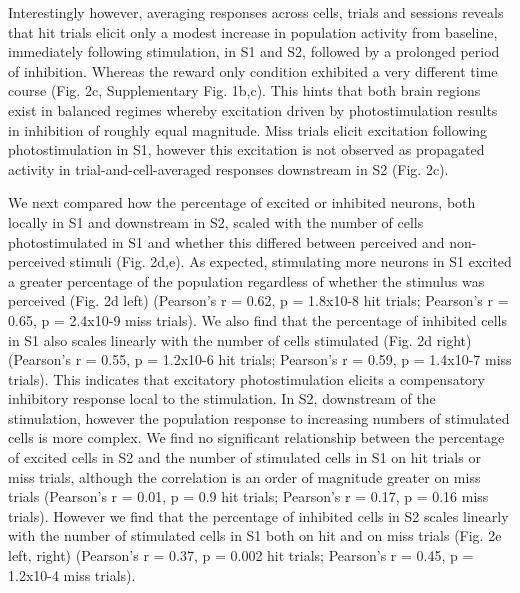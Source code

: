 \begin{figure}[htbp]
{} 
\label{fig:basic-analysis}
\end{figure}

Interestingly however, averaging responses across cells, trials and sessions reveals that hit trials elicit only a modest increase in population activity from baseline, immediately following stimulation, in S1 and S2, followed by a prolonged period of inhibition. Whereas the reward only condition exhibited a very different time course (Fig. 2c,  Supplementary Fig. 1b,c). This hints that both brain regions exist in balanced regimes whereby excitation driven by photostimulation results in inhibition of roughly equal magnitude. Miss trials elicit excitation following photostimulation in S1, however this excitation is not observed as propagated activity in trial-and-cell-averaged responses downstream in S2 (Fig. 2c). 

We next compared how the percentage of excited or inhibited neurons, both locally in S1 and downstream in S2, scaled with the number of cells photostimulated in S1 and whether this differed between perceived and non-perceived stimuli (Fig. 2d,e). As expected, stimulating more neurons in S1 excited a greater percentage of the population regardless of whether the stimulus was perceived (Fig. 2d left) (Pearson’s r = 0.62, p  = 1.8x10-8 hit trials; Pearson’s r = 0.65, p = 2.4x10-9 miss trials). We also find that the percentage of inhibited cells in S1 also scales linearly with the number of cells stimulated (Fig. 2d right) (Pearson’s r = 0.55, p = 1.2x10-6 hit trials; Pearson’s r = 0.59, p = 1.4x10-7 miss trials). This indicates that excitatory photostimulation elicits a compensatory inhibitory response local to the stimulation. In S2, downstream of the stimulation, however the population response to increasing numbers of stimulated cells is more complex. We find no significant relationship between the percentage of excited cells in S2 and the number of stimulated cells in S1 on hit trials or miss trials, although the correlation is an order of magnitude greater on miss trials (Pearson’s r = 0.01, p = 0.9 hit trials; Pearson’s r = 0.17, p = 0.16 miss trials). However we find that the percentage of inhibited cells in S2 scales linearly with the number of stimulated cells in S1 both on hit and on miss trials (Fig. 2e left, right) (Pearson’s r = 0.37, p = 0.002 hit trials; Pearson’s r = 0.45, p = 1.2x10-4 miss trials).

